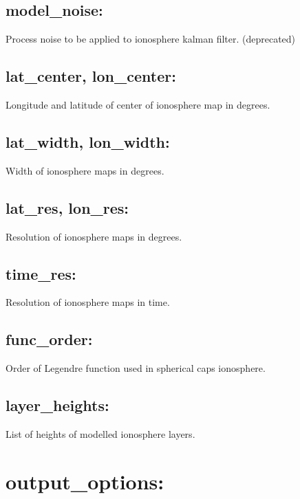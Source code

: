 \subsection*{model\_noise:}

Process noise to be applied to ionosphere kalman filter. (deprecated)

\subsection*{lat\_center, lon\_center:}

Longitude and latitude of center of ionosphere map in degrees.

\subsection*{lat\_width, lon\_width:}

Width of ionosphere maps in degrees.

\subsection*{lat\_res, lon\_res:}

Resolution of ionosphere maps in degrees.

\subsection*{time\_res:}

Resolution of ionosphere maps in time.

\subsection*{func\_order:}

Order of Legendre function used in spherical caps ionosphere.

\subsection*{layer\_heights:}

List of heights of modelled ionosphere layers.











\section{output\_options:}

